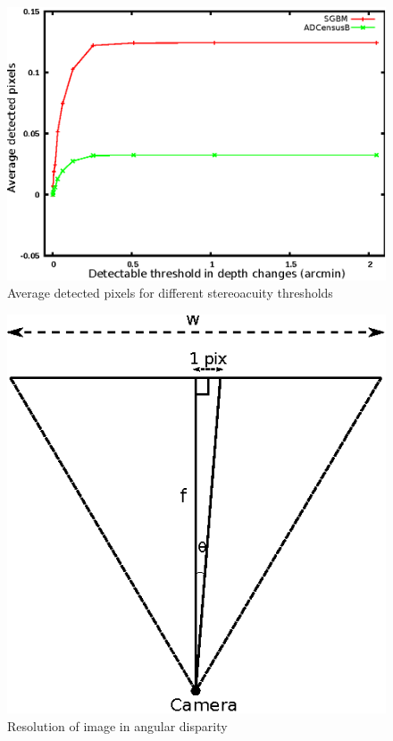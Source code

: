 \begin{figure}[H]
\centering
\includegraphics{algthreshBoth}
\caption{Average detected pixels for different stereoacuity thresholds}
\label{fig:algthresh}
\end{figure} 
\begin{figure}[H]
\centering
\includegraphics{camRes}
\caption{Resolution of image in angular disparity}
\label{fig:camResolution}
\end{figure}

